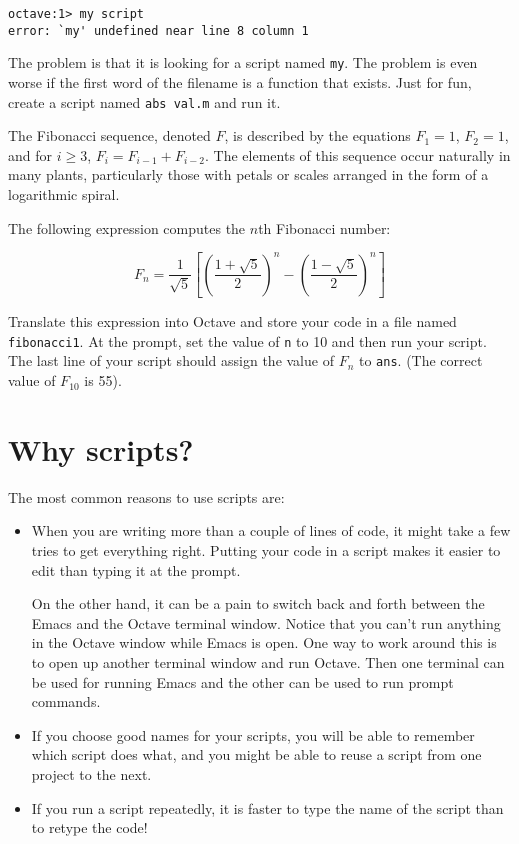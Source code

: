 \begin{verbatim}
octave:1> my script
error: `my' undefined near line 8 column 1
\end{verbatim}

The problem is that it is looking for a script named {\tt my}. The
problem is even worse if the first word of the filename is a function
that exists. Just for fun, create a script named {\tt abs val.m}
and run it.

\begin{ex}
The Fibonacci sequence, denoted $F$, is described by the equations
$F_1 = 1$, $F_2 = 1$, and for $i \ge 3$, $F_{i} = F_{i-1} + F_{i-2}$.
The elements of this sequence occur naturally in many plants,
particularly those with petals or scales arranged in the form of a
logarithmic spiral.

The following expression computes the
$n$th Fibonacci number:

\begin{equation}
F_n = \frac{1}{\sqrt{5}}
\left[ 
\left( \frac{1 + \sqrt{5}}{2} \right)^{n} -
\left( \frac{1 - \sqrt{5}}{2} \right)^{n}
\right]
\end{equation}

Translate this expression into Octave and store your
code in a file named {\tt fibonacci1}. At the prompt, set the value
of {\tt n} to 10 and then run your script. The last line of your
script should assign the value of $F_n$ to {\tt ans}.
(The correct value of $F_{10}$ is 55).
\end{ex}


\section{Why scripts?}

The most common reasons to use scripts are:

\begin{itemize}

\item When you are writing more than a couple of lines of code, it
might take a few tries to get everything right. Putting your code
in a script makes it easier to edit than typing it at the prompt.

On the other hand, it can be a pain to switch back and forth between
the Emacs and the Octave terminal window. Notice that you can't run anything
in the Octave window while Emacs is open. One way to work around this is to
open up another terminal window and run Octave. Then one terminal can be used
for running Emacs and the other can be used to run prompt commands.

\item If you choose good names for your scripts, you will be able
to remember which script does what, and you might be able to reuse
a script from one project to the next.

\item If you run a script repeatedly, it is faster to type the
name of the script than to retype the code!

\end{itemize}

